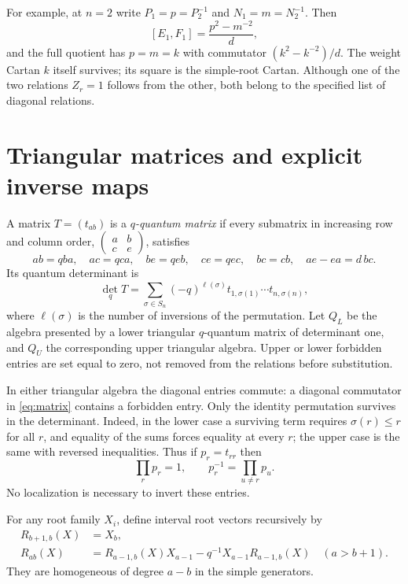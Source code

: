 \documentclass[11pt]{article}
\theoremstyle{definition}
\theoremstyle{remark}
\begin{document}
For example, at $n=2$ write $P_1=p=P_2^{-1}$ and $N_1=m=N_2^{-1}$. Then
\[
 [E_1,F_1]=\frac{p^2-m^{-2}}d,
\]
and the full quotient has $p=m=k$ with commutator $(k^2-k^{-2})/d$. The weight Cartan $k$ itself survives; its square is the simple-root Cartan. Although one of the two relations $Z_r=1$ follows from the other, both belong to the specified list of diagonal relations.

\section{Triangular matrices and explicit inverse maps}\label{sec:matrices}

A matrix $T=(t_{ab})$ is a \emph{$q$-quantum matrix} if every submatrix in increasing row and column order,
$\left(\begin{smallmatrix}a&b\\c&e\end{smallmatrix}\right)$, satisfies
\begin{equation}\label{eq:matrix}
 ab=qba,\quad ac=qca,\quad be=qeb,\quad ce=qec,\quad bc=cb,\quad ae-ea=d\,bc.
\end{equation}
Its quantum determinant is
\[
 \det_qT=\sum_{\sigma\in S_n}(-q)^{\ell(\sigma)}t_{1,\sigma(1)}\cdots t_{n,\sigma(n)},
\]
where $\ell(\sigma)$ is the number of inversions of the permutation. Let $Q_L$ be the algebra presented by a lower triangular $q$-quantum matrix of determinant one, and $Q_U$ the corresponding upper triangular algebra. Upper or lower forbidden entries are set equal to zero, not removed from the relations before substitution.

In either triangular algebra the diagonal entries commute: a diagonal commutator in \eqref{eq:matrix} contains a forbidden entry. Only the identity permutation survives in the determinant. Indeed, in the lower case a surviving term requires $\sigma(r)\leq r$ for all $r$, and equality of the sums forces equality at every $r$; the upper case is the same with reversed inequalities. Thus if $p_r=t_{rr}$ then
\begin{equation}\label{eq:diag-inverse}
 \prod_rp_r=1,\qquad p_r^{-1}=\prod_{u\ne r}p_u.
\end{equation}
No localization is necessary to invert these entries.

For any root family $X_i$, define interval root vectors recursively by
\begin{equation}\label{eq:root-vectors}
 \begin{aligned}
 R_{b+1,b}(X)&=X_b,\\
 R_{ab}(X)&=R_{a-1,b}(X)X_{a-1}-q^{-1}X_{a-1}R_{a-1,b}(X)\quad(a>b+1).
 \end{aligned}
\end{equation}
They are homogeneous of degree $a-b$ in the simple generators.
\end{document}
